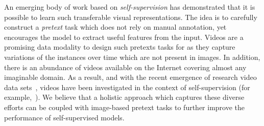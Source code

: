 \documentclass[10pt,twocolumn,letterpaper]{article}
\begin{document}
An emerging body of work based on \emph{self-supervision} has demonstrated that it is possible to learn such transferable visual representations. The idea is to carefully construct a \emph{pretext} task which does not rely on manual annotation, yet encourages the model to extract useful features from the input. Videos are a promising data modality to design such pretexts tasks for as they capture variations of the instances over time which are not present in images. In addition, there is an abundance of videos available on the Internet covering almost any imaginable domain. 
As a result, and with the recent emergence of research video data sets~\cite{abu2016youtube, thomee2016yfcc100m}, videos have been investigated in the context of self-supervision (for example,~\cite{misra2016shuffle,wei2018learning,wang2017transitive,isola2015learning,wiskott2002slow,zou2011unsupervised,mobahi2009deep,sayed2018cross,ngiam2011multimodal,arandjelovic2017look,agrawal2015learning}). We believe that a holistic approach which captures these diverse efforts can be coupled with image-based pretext tasks to further improve the performance of self-supervised models.
\end{document}
